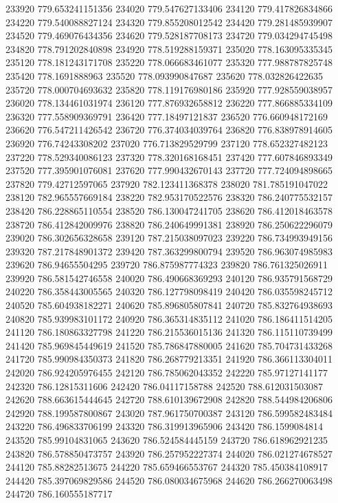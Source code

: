 {233920 779.653241151356
234020 779.547627133406
234120 779.417826834866
234220 779.540088827124
234320 779.855208012542
234420 779.281485939907
234520 779.469076434356
234620 779.528187708173
234720 779.034294745498
234820 778.791202840898
234920 778.519288159371
235020 778.163095335345
235120 778.181243171708
235220 778.066683461077
235320 777.988787825748
235420 778.1691888963
235520 778.093990847687
235620 778.032826422635
235720 778.000704693632
235820 778.119176980186
235920 777.928559038957
236020 778.134461031974
236120 777.876932658812
236220 777.866885334109
236320 777.558909369791
236420 777.18497121837
236520 776.660948172169
236620 776.547211426542
236720 776.374034039764
236820 776.838978914605
236920 776.74243308202
237020 776.713829529799
237120 778.652327482123
237220 778.529340086123
237320 778.320168168451
237420 777.607846893349
237520 777.395901076081
237620 777.990432670143
237720 777.724094898665
237820 779.42712597065
237920 782.123411368378
238020 781.785191047022
238120 782.965557669184
238220 782.953170522576
238320 786.240775532157
238420 786.228865110554
238520 786.130047241705
238620 786.412018463578
238720 786.412842009976
238820 786.240649991381
238920 786.250622296079
239020 786.302656328658
239120 787.215038097023
239220 786.734993949156
239320 787.217848901372
239420 787.363299800794
239520 786.963074985983
239620 786.94655504295
239720 786.875987774323
239820 786.761325026911
239920 786.581542746558
240020 786.490668369293
240120 786.935791568729
240220 786.358443005565
240320 786.127798098419
240420 786.035598245712
240520 785.604938182271
240620 785.896805807841
240720 785.832764938693
240820 785.939983101172
240920 786.365314835112
241020 786.186411514205
241120 786.180863327798
241220 786.215536015136
241320 786.115110739499
241420 785.969845449619
241520 785.786847880005
241620 785.704731433268
241720 785.990984350373
241820 786.268779213351
241920 786.366113304011
242020 786.924205976455
242120 786.785062043352
242220 785.97127141177
242320 786.12815311606
242420 786.04117158788
242520 788.612031503087
242620 788.663615444645
242720 788.610139672908
242820 788.544984206806
242920 788.199587800867
243020 787.961750700387
243120 786.599582483484
243220 786.496833706199
243320 786.319913965906
243420 786.1599084814
243520 785.99104831065
243620 786.524584445159
243720 786.618962921235
243820 786.578850473757
243920 786.257952227374
244020 786.021274678527
244120 785.88282513675
244220 785.659466553767
244320 785.450384108917
244420 785.397069829586
244520 786.080034675968
244620 786.266270063498
244720 786.160555187717
}
